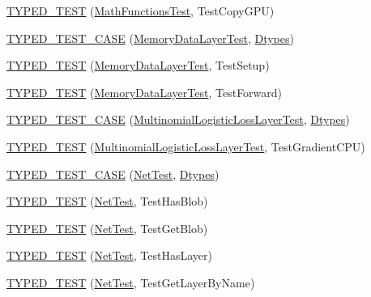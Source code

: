 \begin{DoxyCompactItemize}
\hyperlink{namespacecaffe_a17c1791a55e36f4e0d0053d24fbff7bd}{T\+Y\+P\+E\+D\+\_\+\+T\+E\+S\+T} (\hyperlink{classcaffe_1_1_math_functions_test}{Math\+Functions\+Test}, Test\+Copy\+G\+P\+U)
\item 
\hyperlink{namespacecaffe_aa71a337c23ffccbd1b4822f4ee54d352}{T\+Y\+P\+E\+D\+\_\+\+T\+E\+S\+T\+\_\+\+C\+A\+S\+E} (\hyperlink{classcaffe_1_1_memory_data_layer_test}{Memory\+Data\+Layer\+Test}, \hyperlink{namespacecaffe_a131dc2be50f2f10e18450da61cde6b57}{Dtypes})
\item 
\hyperlink{namespacecaffe_a7f15dc15e2a52f25d857ad78f0217d4c}{T\+Y\+P\+E\+D\+\_\+\+T\+E\+S\+T} (\hyperlink{classcaffe_1_1_memory_data_layer_test}{Memory\+Data\+Layer\+Test}, Test\+Setup)
\item 
\hyperlink{namespacecaffe_a201f2e30cd96398e6c11bed01d379ce9}{T\+Y\+P\+E\+D\+\_\+\+T\+E\+S\+T} (\hyperlink{classcaffe_1_1_memory_data_layer_test}{Memory\+Data\+Layer\+Test}, Test\+Forward)
\item 
\hyperlink{namespacecaffe_aaccc88a7b2d88ba42b62c51aa0dd4c44}{T\+Y\+P\+E\+D\+\_\+\+T\+E\+S\+T\+\_\+\+C\+A\+S\+E} (\hyperlink{classcaffe_1_1_multinomial_logistic_loss_layer_test}{Multinomial\+Logistic\+Loss\+Layer\+Test}, \hyperlink{namespacecaffe_a131dc2be50f2f10e18450da61cde6b57}{Dtypes})
\item 
\hyperlink{namespacecaffe_a7fd7703721d72c6711393b4437317ce7}{T\+Y\+P\+E\+D\+\_\+\+T\+E\+S\+T} (\hyperlink{classcaffe_1_1_multinomial_logistic_loss_layer_test}{Multinomial\+Logistic\+Loss\+Layer\+Test}, Test\+Gradient\+C\+P\+U)
\item 
\hyperlink{namespacecaffe_a7584c6b224847e7a815a38414f4a3dcf}{T\+Y\+P\+E\+D\+\_\+\+T\+E\+S\+T\+\_\+\+C\+A\+S\+E} (\hyperlink{classcaffe_1_1_net_test}{Net\+Test}, \hyperlink{namespacecaffe_a131dc2be50f2f10e18450da61cde6b57}{Dtypes})
\item 
\hyperlink{namespacecaffe_a1b42d2b10b1e5f11decf19644da3039c}{T\+Y\+P\+E\+D\+\_\+\+T\+E\+S\+T} (\hyperlink{classcaffe_1_1_net_test}{Net\+Test}, Test\+Has\+Blob)
\item 
\hyperlink{namespacecaffe_afef4d886097d614be56c4d777734582f}{T\+Y\+P\+E\+D\+\_\+\+T\+E\+S\+T} (\hyperlink{classcaffe_1_1_net_test}{Net\+Test}, Test\+Get\+Blob)
\item 
\hyperlink{namespacecaffe_af0a8b2146dca0f14700299ab7229d468}{T\+Y\+P\+E\+D\+\_\+\+T\+E\+S\+T} (\hyperlink{classcaffe_1_1_net_test}{Net\+Test}, Test\+Has\+Layer)
\item 
\hyperlink{namespacecaffe_aa0bccca8ff4fff7fdd6c5c09234756b2}{T\+Y\+P\+E\+D\+\_\+\+T\+E\+S\+T} (\hyperlink{classcaffe_1_1_net_test}{Net\+Test}, Test\+Get\+Layer\+By\+Name)

\end{DoxyCompactItemize}
